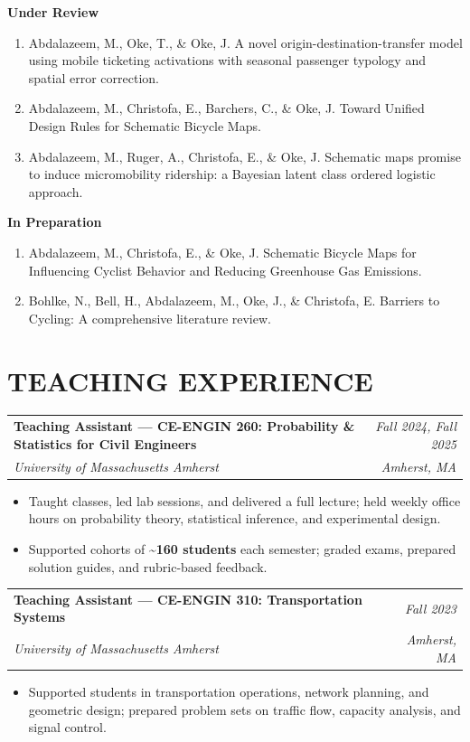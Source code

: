 \documentclass[10pt, a4paper]{article}
\makeatletter
\newcommand{\entry}[4]{%
  \noindent
  \begin{tabularx}{\linewidth}{@{}X@{\hspace{4pt}}r@{}}
    \textbf{#1} & \textit{\small\color{subtle}#2} \\
    \textit{\small\color{subtle}#3} & \textit{\small\color{subtle}#4}
  \end{tabularx}\vspace{2pt}%
}
\newenvironment{publist}{%
  \begin{enumerate}[leftmargin=1.8em, label=\arabic*., itemsep=3pt, topsep=2pt]
}{%
  \end{enumerate}
}
\makeatother
\begin{document}
\vspace{6pt}
\textbf{Under Review}
\begin{publist}
  \item Abdalazeem, M., Oke, T., \& Oke, J. A novel origin-destination-transfer model using mobile ticketing activations with seasonal passenger typology and spatial error correction.
  \item Abdalazeem, M., Christofa, E., Barchers, C., \& Oke, J. Toward Unified Design Rules for Schematic Bicycle Maps.
  \item Abdalazeem, M., Ruger, A., Christofa, E., \& Oke, J. Schematic maps promise to induce micromobility ridership: a Bayesian latent class ordered logistic approach.
\end{publist}

\vspace{6pt}
\textbf{In Preparation}
\begin{publist}
  \item Abdalazeem, M., Christofa, E., \& Oke, J. Schematic Bicycle Maps for Influencing Cyclist Behavior and Reducing Greenhouse Gas Emissions.
  \item Bohlke, N., Bell, H., Abdalazeem, M., Oke, J., \& Christofa, E. Barriers to Cycling: A comprehensive literature review.
\end{publist}

\section{TEACHING EXPERIENCE}

\entry{Teaching Assistant --- CE-ENGIN 260: Probability \& Statistics for Civil Engineers}{Fall 2024, Fall 2025}
      {University of Massachusetts Amherst}{Amherst, MA}
\begin{itemize}
  \item Taught classes, led lab sessions, and delivered a full lecture; held weekly office hours on probability theory, statistical inference, and experimental design.
  \item Supported cohorts of \textbf{\textasciitilde160 students} each semester; graded exams, prepared solution guides, and rubric-based feedback.
\end{itemize}

\vspace{4pt}
\entry{Teaching Assistant --- CE-ENGIN 310: Transportation Systems}{Fall 2023}
      {University of Massachusetts Amherst}{Amherst, MA}
\begin{itemize}
  \item Supported students in transportation operations, network planning, and geometric design; prepared problem sets on traffic flow, capacity analysis, and signal control.
\end{itemize}
\end{document}
